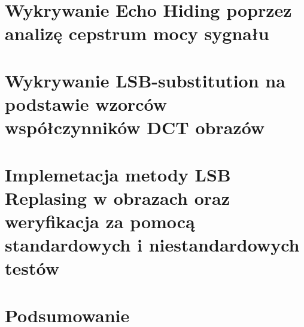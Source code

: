 \documentclass[a4paper,12pt]{article}
\begin{document}
\clearpage
\section{Wykrywanie Echo Hiding poprzez analizę cepstrum mocy sygnału}


\clearpage
\section{Wykrywanie LSB-substitution na podstawie wzorców współczynników DCT obrazów}


\clearpage
\section{Implemetacja metody LSB Replasing w obrazach oraz weryfikacja za pomocą standardowych i niestandardowych testów}


\section{Podsumowanie}

\printbibliography[title={Źródła}] %
\end{document}
